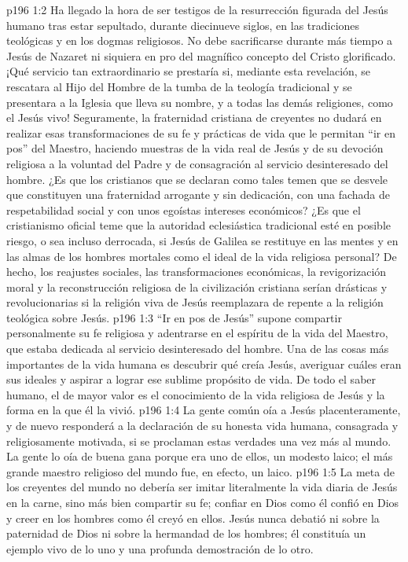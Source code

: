 \vs p196 1:2 Ha llegado la hora de ser testigos de la resurrección figurada del Jesús humano tras estar sepultado, durante diecinueve siglos, en las tradiciones teológicas y en los dogmas religiosos. No debe sacrificarse durante más tiempo a Jesús de Nazaret ni siquiera en pro del magnífico concepto del Cristo glorificado. ¡Qué servicio tan extraordinario se prestaría si, mediante esta revelación, se rescatara al Hijo del Hombre de la tumba de la teología tradicional y se presentara a la Iglesia que lleva su nombre, y a todas las demás religiones, como el Jesús vivo! Seguramente, la fraternidad cristiana de creyentes no dudará en realizar esas transformaciones de su fe y prácticas de vida que le permitan “ir en pos” del Maestro, haciendo muestras de la vida real de Jesús y de su devoción religiosa a la voluntad del Padre y de consagración al servicio desinteresado del hombre. ¿Es que los cristianos que se declaran como tales temen que se desvele que constituyen una fraternidad arrogante y sin dedicación, con una fachada de respetabilidad social y con unos egoístas intereses económicos? ¿Es que el cristianismo oficial teme que la autoridad eclesiástica tradicional esté en posible riesgo, o sea incluso derrocada, si Jesús de Galilea se restituye en las mentes y en las almas de los hombres mortales como el ideal de la vida religiosa personal? De hecho, los reajustes sociales, las transformaciones económicas, la revigorización moral y la reconstrucción religiosa de la civilización cristiana serían drásticas y revolucionarias si la religión viva de Jesús reemplazara de repente a la religión teológica sobre Jesús.
\vs p196 1:3 \pc “Ir en pos de Jesús” supone compartir personalmente su fe religiosa y adentrarse en el espíritu de la vida del Maestro, que estaba dedicada al servicio desinteresado del hombre. Una de las cosas más importantes de la vida humana es descubrir qué creía Jesús, averiguar cuáles eran sus ideales y aspirar a lograr ese sublime propósito de vida. De todo el saber humano, el de mayor valor es el conocimiento de la vida religiosa de Jesús y la forma en la que él la vivió.
\vs p196 1:4 La gente común oía a Jesús placenteramente, y de nuevo responderá a la declaración de su honesta vida humana, consagrada y religiosamente motivada, si se proclaman estas verdades una vez más al mundo. La gente lo oía de buena gana porque era uno de ellos, un modesto laico; el más grande maestro religioso del mundo fue, en efecto, un laico.
\vs p196 1:5 La meta de los creyentes del mundo no debería ser imitar literalmente la vida diaria de Jesús en la carne, sino más bien compartir su fe; confiar en Dios como él confió en Dios y creer en los hombres como él creyó en ellos. Jesús nunca debatió ni sobre la paternidad de Dios ni sobre la hermandad de los hombres; él constituía un ejemplo vivo de lo uno y una profunda demostración de lo otro.
